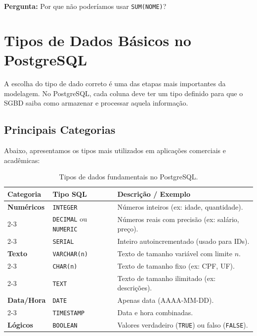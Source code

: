 \documentclass[12pt,a4paper,openright]{book}
\begin{document}
\begin{tcolorbox}[colback=orange!5,colframe=orange!70!black,title=Reflexão para o Aluno]
\textbf{Pergunta:} Por que não poderíamos usar \texttt{SUM(NOME)}?
\end{tcolorbox}

\section{Tipos de Dados Básicos no PostgreSQL}

A escolha do tipo de dado correto é uma das etapas mais importantes da modelagem. No PostgreSQL, cada coluna deve ter um tipo definido para que o SGBD saiba como armazenar e processar aquela informação.



\subsection{Principais Categorias}

Abaixo, apresentamos os tipos mais utilizados em aplicações comerciais e acadêmicas:

\begin{table}[H]
    \centering
    \renewcommand{\arraystretch}{1.5}
    \begin{tabular}{|l|l|l|}
        \hline
        \textbf{Categoria} & \textbf{Tipo SQL} & \textbf{Descrição / Exemplo} \\ \hline
        \textbf{Numéricos} & \texttt{INTEGER} & Números inteiros (ex: idade, quantidade). \\ \cline{2-3} 
         & \texttt{DECIMAL} ou \texttt{NUMERIC} & Números reais com precisão (ex: salário, preço). \\ \cline{2-3} 
         & \texttt{SERIAL} & Inteiro autoincrementado (usado para IDs). \\ \hline
        \textbf{Texto} & \texttt{VARCHAR(n)} & Texto de tamanho variável com limite $n$. \\ \cline{2-3} 
         & \texttt{CHAR(n)} & Texto de tamanho fixo (ex: CPF, UF). \\ \cline{2-3} 
         & \texttt{TEXT} & Texto de tamanho ilimitado (ex: descrições). \\ \hline
        \textbf{Data/Hora} & \texttt{DATE} & Apenas data (AAAA-MM-DD). \\ \cline{2-3} 
         & \texttt{TIMESTAMP} & Data e hora combinadas. \\ \hline
        \textbf{Lógicos} & \texttt{BOOLEAN} & Valores verdadeiro (\texttt{TRUE}) ou falso (\texttt{FALSE}). \\ \hline
    \end{tabular}
    \caption{Tipos de dados fundamentais no PostgreSQL.}
\end{table}
\end{document}
